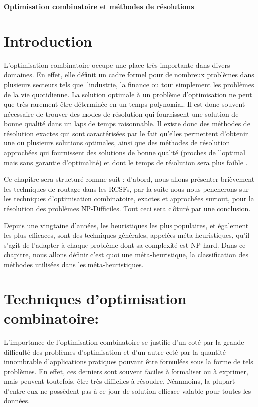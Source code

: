 \cleardoublepage


\setcounter{chapter}{2}
\setcounter{section}{0}
\setcounter{figure}{0}

\begin{center}
	\Huge\textbf{Optimisation combinatoire et méthodes de résolutions }
\end{center}

\section{Introduction}
L’optimisation combinatoire occupe une place très importante dans divers domaines. En effet, elle définit un cadre formel pour de nombreux problèmes dans plusieurs secteurs tels que l’industrie, la finance ou tout simplement les problèmes de la vie quotidienne.
La solution optimale à un problème d’optimisation ne peut que très rarement être déterminée en un temps polynomial. Il est donc souvent nécessaire de trouver des modes de résolution qui fournissent une solution de bonne qualité dans un laps de temps raisonnable. Il existe donc des méthodes de résolution exactes qui sont caractérisées par le fait qu’elles permettent d’obtenir une ou plusieurs solutions optimales, ainsi que des méthodes de résolution approchées qui fournissent des solutions de bonne qualité (proches de l’optimal mais sans garantie d’optimalité) et dont le temps de résolution sera plus faible \cite{zidi2006systeme}.

Ce chapitre sera structuré comme suit : d’abord, nous allons présenter brièvement les techniques de routage dans les RCSFs, par la suite nous nous pencherons sur les techniques d’optimisation combinatoire, exactes et approchées surtout, pour la résolution des problèmes NP-Difficiles. Tout ceci sera clôturé par une conclusion.

Depuis une vingtaine d’années, les heuristiques les plus populaires, et également les plus efficaces, sont des techniques générales, appelées méta-heuristiques, qu’il s’agit de l’adapter à chaque problème dont sa complexité est NP-hard. Dans ce chapitre, nous allons définir c’est quoi une méta-heuristique, la classification des méthodes utilisées dans les méta-heuristiques. 

\section{Techniques d’optimisation combinatoire:}
L’importance de l’optimisation combinatoire se justifie d’un coté par la grande difficulté des problèmes d’optimisation et d’un autre coté par la quantité innombrable d’applications pratiques pouvant être formulées sous la forme de tels problèmes. En effet, ces derniers sont souvent faciles à formaliser ou à exprimer, mais peuvent toutefois, être très difficiles à résoudre. Néanmoins, la plupart d’entre eux ne possèdent pas à ce jour de solution efficace valable pour toutes les données. \cite{hao1999metaheuristiques}

